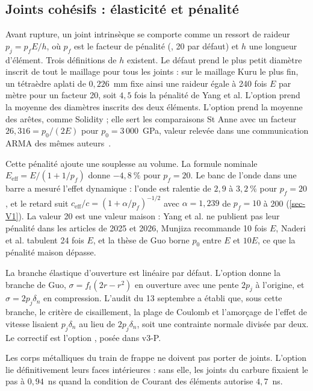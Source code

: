 \subsection{Joints cohésifs : élasticité et pénalité}
\label{sec-penalite}

Avant rupture, un joint intrinsèque se comporte comme un ressort de raideur $p_j = p_f E/h$, où $p_f$ est le facteur de pénalité (, 20 par défaut) et $h$ une longueur d'élément. Trois définitions de $h$ existent. Le défaut  prend le plus petit diamètre inscrit de tout le maillage pour tous les joints : sur le maillage Kuru le plus fin, un tétraèdre aplati de $0{,}226$~mm fixe ainsi une raideur égale à 240 fois $E$ par mètre pour un facteur 20, soit $4{,}5$ fois la pénalité de Yang et al. L'option  prend la moyenne des diamètres inscrits des deux éléments. L'option  prend la moyenne des arêtes, comme Solidity ; elle sert les comparaisons St Anne avec un facteur $26{,}316 = p_0/(2E)$ pour $p_0 = 3\,000$~GPa, valeur relevée dans une communication ARMA des mêmes auteurs~\cite{yang2024energy}.

Cette pénalité ajoute une souplesse au volume. La formule nominale $E_\text{eff} = E/(1 + 1/p_f)$ donne $-4{,}8~\%$ pour $p_f = 20$. Le banc de l'onde dans une barre a mesuré l'effet dynamique : l'onde est ralentie de $2{,}9$ à $3{,}2~\%$ pour $p_f = 20$, et le retard suit $c_\text{eff}/c = (1 + \alpha/p_f)^{-1/2}$ avec $\alpha = 1{,}239$ de $p_f = 10$ à 200 (\cref{sec-V1}). La valeur 20 est une valeur maison : Yang et al. ne publient pas leur pénalité dans les articles de 2025 et 2026, Munjiza recommande 10 fois $E$, Naderi et al. tabulent 24 fois $E$, et la thèse de Guo borne $p_0$ entre $E$ et $10E$, ce que la pénalité maison dépasse.

La branche élastique d'ouverture est linéaire par défaut. L'option  donne la branche de Guo, $\sigma = f_t(2r - r^2)$ en ouverture avec une pente $2p_j$ à l'origine, et $\sigma = 2p_j\delta_n$ en compression. L'audit du 13 septembre a établi que, sous cette branche, le critère de cisaillement, la plage de Coulomb et l'amorçage de l'effet de vitesse lisaient $p_j\delta_n$ au lieu de $2p_j\delta_n$, soit une contrainte normale divisée par deux. Le correctif est l'option , posée dans v3-P.

Les corps métalliques du train de frappe ne doivent pas porter de joints. L'option  lie définitivement leurs faces intérieures : sans elle, les joints du carbure fixaient le pas à $0{,}94$~ns quand la condition de Courant des éléments autorise $4{,}7$~ns.


